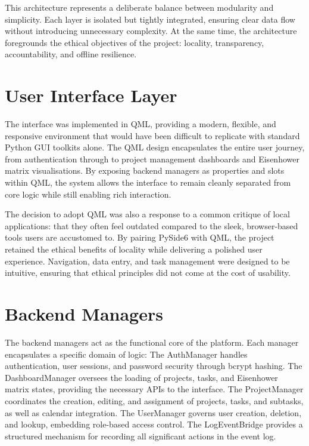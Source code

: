 \documentclass{report}
\begin{document}
This architecture represents a deliberate balance between modularity and simplicity. Each layer is isolated but tightly integrated, ensuring clear data flow without introducing unnecessary complexity. At the same time, the architecture foregrounds the ethical objectives of the project: locality, transparency, accountability, and offline resilience.
\section{User Interface Layer}

The interface was implemented in QML, providing a modern, flexible, and responsive environment that would have been difficult to replicate with standard Python GUI toolkits alone. The QML design encapsulates the entire user journey, from authentication through to project management dashboards and Eisenhower matrix visualisations. By exposing backend managers as properties and slots within QML, the system allows the interface to remain cleanly separated from core logic while still enabling rich interaction.

The decision to adopt QML was also a response to a common critique of local applications: that they often feel outdated compared to the sleek, browser-based tools users are accustomed to. By pairing PySide6 with QML, the project retained the ethical benefits of locality while delivering a polished user experience. Navigation, data entry, and task management were designed to be intuitive, ensuring that ethical principles did not come at the cost of usability.

\section{Backend Managers}

The backend managers act as the functional core of the platform. Each manager encapsulates a specific domain of logic:
The AuthManager handles authentication, user sessions, and password security through bcrypt hashing.
The DashboardManager oversees the loading of projects, tasks, and Eisenhower matrix states, providing the necessary APIs to the interface.
The ProjectManager coordinates the creation, editing, and assignment of projects, tasks, and subtasks, as well as calendar integration.
The UserManager governs user creation, deletion, and lookup, embedding role-based access control.
The LogEventBridge provides a structured mechanism for recording all significant actions in the event log.
\end{document}

